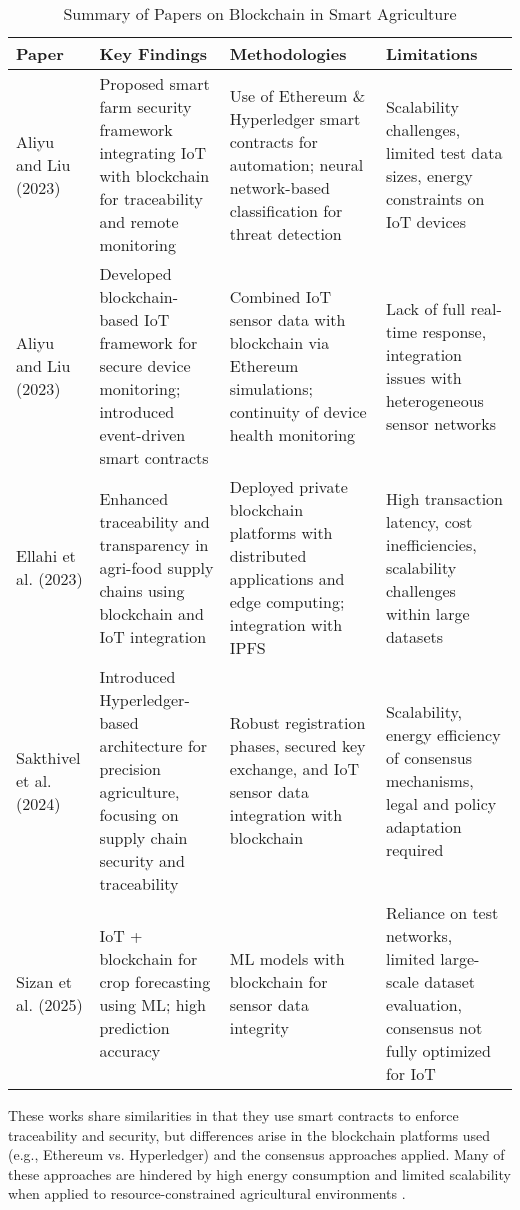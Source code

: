 \documentclass[12pt,onecolumn]{IEEEtran} %
\newcommand{\fitToPage}[1]{\begin{adjustbox}{max width=\textwidth}#1\end{adjustbox}}
\renewcommand{\arraystretch}{1.2}
\begin{document}
\begin{table}[htbp]
\caption{Summary of Papers on Blockchain in Smart Agriculture}
\label{table1}
\centering
\fitToPage{
\begingroup
\setlength{\tabcolsep}{4pt}
\renewcommand{\arraystretch}{1.15}
\footnotesize
\begin{tabularx}{\textwidth}{@{}P{0.18\textwidth}YYY@{}}
\toprule
\textbf{Paper} & \textbf{Key Findings} & \textbf{Methodologies} & \textbf{Limitations} \\
\midrule
Aliyu and Liu (2023) & Proposed smart farm security framework integrating IoT with blockchain for traceability and remote monitoring & Use of Ethereum \& Hyperledger smart contracts for automation; neural network-based classification for threat detection & Scalability challenges, limited test data sizes, energy constraints on IoT devices \\
\addlinespace
Aliyu and Liu (2023) & Developed blockchain-based IoT framework for secure device monitoring; introduced event-driven smart contracts & Combined IoT sensor data with blockchain via Ethereum simulations; continuity of device health monitoring & Lack of full real-time response, integration issues with heterogeneous sensor networks \\
\addlinespace
Ellahi et al. (2023) & Enhanced traceability and transparency in agri-food supply chains using blockchain and IoT integration & Deployed private blockchain platforms with distributed applications and edge computing; integration with IPFS & High transaction latency, cost inefficiencies, scalability challenges within large datasets \\
\addlinespace
Sakthivel et al. (2024) & Introduced Hyperledger-based architecture for precision agriculture, focusing on supply chain security and traceability & Robust registration phases, secured key exchange, and IoT sensor data integration with blockchain & Scalability, energy efficiency of consensus mechanisms, legal and policy adaptation required \\
\addlinespace
Sizan et al. (2025) & IoT + blockchain for crop forecasting using ML; high prediction accuracy & ML models with blockchain for sensor data integrity & Reliance on test networks, limited large-scale dataset evaluation, consensus not fully optimized for IoT \\
\bottomrule
\end{tabularx}
\endgroup
}
\end{table}




These works share similarities in that they use smart contracts to enforce traceability and security, but differences arise in the blockchain platforms used (e.g., Ethereum vs. Hyperledger) and the consensus approaches applied. Many of these approaches are hindered by high energy consumption and limited scalability when applied to resource-constrained agricultural environments \cite{aliyu2023blockchainbasedsmartfarm, ellahi2023blockchainbasedframeworksfor}.
\end{document}
